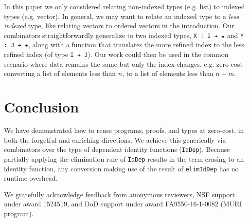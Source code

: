 \documentclass[acmsmall,screen]{acmart}
\newcommand{\labsec}[1]{\label{sec:#1}}
\begin{document}
In this paper we only considered relating non-indexed types (e.g. list)
to indexed types (e.g. vector). In general, we may want to relate
an indexed type to a \textit{less indexed} type, like relating vectors
to ordered vectors in the introduction. Our combinators
straightforwardly generalize to two indexed types, \verb;X : I ➔ ★; and
\verb;Y : J ➔ ★;, along with a function that translates
the more refined index to the less refined index
(of type \verb;I ➔ J;). Our work could then be used in the common
scenario where data remains the same but only the index changes,
e.g. zero-cost converting a list of elements less than $n$, to a list
of elements less than $n + m$.

\section{Conclusion}
\labsec{conc}

We have demonstrated how to reuse programs, proofs, and types at
zero-cost, in both the forgetful and enriching directions. We achieve
this generically via combinators over the type of dependent identity
functions (\verb;IdDep;). Because partially applying the elimination
rule of \verb;IdDep; results in the term erasing to an identity
function, any conversion making use of the result of \verb;elimIdDep;
has no runtime overhead.

\begin{acks}
  We gratefully acknowledge feedback from anonymous reviewers, NSF
  support under award 1524519, and DoD support under award
  FA9550-16-1-0082 (MURI program).
\end{acks}





\end{document}
